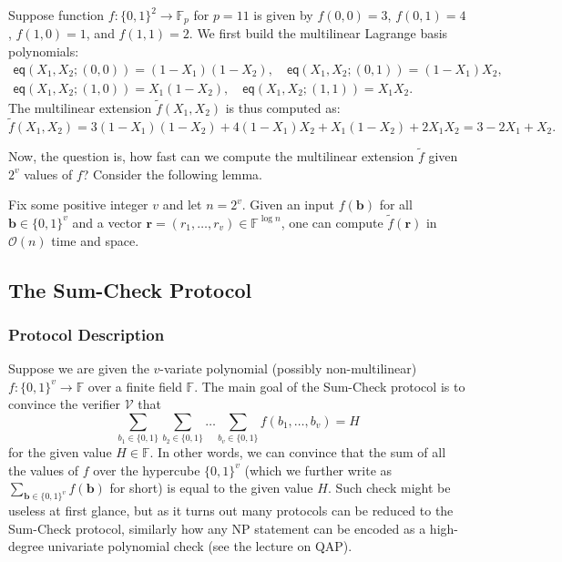 \begin{example}\label{example:mle}
    Suppose function $f: \{0,1\}^2 \to \mathbb{F}_p$ for $p=11$ is given by
    $f(0,0)=3$, $f(0,1)=4$, $f(1,0)=1$, and $f(1,1)=2$. We first build the
    multilinear Lagrange basis polynomials:
    \vspace{-7.5px}
    \begin{gather*}
        \mathsf{eq}(X_1,X_2;(0,0)) = (1-X_1)(1-X_2), \quad
        \mathsf{eq}(X_1,X_2;(0,1)) = (1-X_1)X_2, \\
        \mathsf{eq}(X_1,X_2;(1,0)) = X_1(1-X_2), \quad
        \mathsf{eq}(X_1,X_2;(1,1)) = X_1X_2.
    \end{gather*}
    The multilinear extension $\widetilde{f}(X_1,X_2)$ is thus computed as:
    \vspace{-7.5px}
    \begin{equation*}
        \widetilde{f}(X_1,X_2) = 3(1-X_1)(1-X_2) + 4(1-X_1)X_2 + X_1(1-X_2) + 2X_1X_2 = 3 - 2X_1 + X_2.
    \end{equation*}
\end{example}

Now, the question is, how fast can we compute the multilinear extension
$\widetilde{f}$ given $2^v$ values of $f$? Consider the following lemma.

\begin{lemma}\label{lemma:multilinear-extension-computation}
    Fix some positive integer $v$ and let $n=2^v$. Given an input
    $f(\boldsymbol{b})$ for all $\boldsymbol{b} \in \{0,1\}^v$ and a vector
    $\boldsymbol{r}=(r_1,\dots,r_v) \in \mathbb{F}^{\log n}$, one can compute
    $\widetilde{f}(\mathbf{r})$ in $\mathcal{O}(n)$ time and space.
\end{lemma}

\subsection{The Sum-Check Protocol}

\subsubsection{Protocol Description}

Suppose we are given the $v$-variate polynomial (possibly non-multilinear) $f:
\{0,1\}^v \to \mathbb{F}$ over a finite field $\mathbb{F}$. The main goal
of the Sum-Check protocol \cite{sumcheck} is to convince the verifier $\mathcal{V}$ that
\begin{equation*}
    \sum_{b_1 \in \{0,1\}}\sum_{b_2 \in \{0,1\}} \dots \sum_{b_v \in \{0,1\}} f(b_1,\dots,b_v) = H
\end{equation*}
for the given value $H \in \mathbb{F}$. In other words, we can convince that the
sum of all the values of $f$ over the hypercube $\{0,1\}^v$ (which we further
write as $\sum_{\boldsymbol{b} \in \{0,1\}^v}f(\boldsymbol{b})$ for short) is
equal to the given value $H$. Such check might be useless at first glance, but
as it turns out many protocols can be reduced to the Sum-Check protocol,
similarly how any NP statement can be encoded as a high-degree univariate
polynomial check (see the lecture on QAP).

